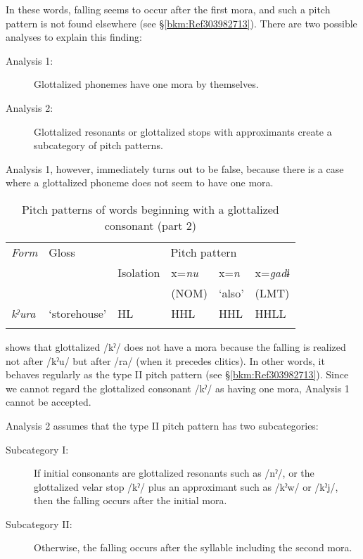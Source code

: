 In these words, falling seems to occur after the first mora, and such a pitch pattern is not found elsewhere (see §\ref{bkm:Ref303982713}). There are two possible analyses to explain this finding:

\begin{description}
\item[Analysis 1:] Glottalized phonemes have one mora by themselves.
\item[Analysis 2:] Glottalized resonants or glottalized stops with approximants create a subcategory of pitch patterns.
\end{description}

Analysis 1, however, immediately turns out to be false, because there is a case where a glottalized phoneme does not seem to have one mora.

\begin{table}
\caption{Pitch patterns of words beginning with a glottalized consonant (part 2)\label{tab:key:22}}
\begin{tabular}{>{\itshape}llllll}
\lsptoprule
\normalfont Form & Gloss & \multicolumn{4}{c}{Pitch pattern}\\\cmidrule(lr){3-6}
     &       & Isolation & x=\textit{nu} & x=\textit{n} & x=\textit{gadɨ}\\
     &       &           & (NOM) & ‘also’ & (LMT)\\\midrule
kˀura &  ‘storehouse’ &  HL &  HHL &  HHL &  HHLL\\
\lspbottomrule
\end{tabular}
\end{table}

 shows that glottalized /kˀ/ does not have a mora because the falling is realized not after /kˀu/ but after /ra/ (when it precedes clitics). In other words, it behaves regularly as the type II pitch pattern (see §\ref{bkm:Ref303982713}). Since we cannot regard the glottalized consonant /kˀ/ as having one mora, Analysis 1 cannot be accepted.

Analysis 2 assumes that the type II pitch pattern has two subcategories:

\begin{description}
\item[Subcategory I:] If initial consonants are glottalized resonants such as /nˀ/, or the glottalized velar stop /kˀ/ plus an approximant such as /kˀw/ or /kˀj/, then the falling occurs after the initial mora.
\item[Subcategory II:] Otherwise, the falling occurs after the syllable including the second mora.
\end{description}

